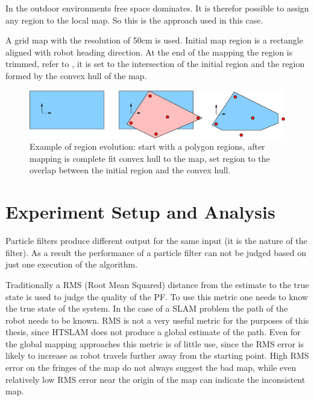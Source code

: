In the outdoor environments free space dominates. It is therefor
possible to assign any region to the local map. So this is the
approach used in this case.

A grid map with the resolution of 50cm is used. Initial map region is
a rectangle aligned with robot heading direction. At the end of the
mapping the region is trimmed, refer to
, it is set to the intersection
of the initial region and the region formed by the convex hull of the
map.

\begin{figure}[htbp]
  \centering
  \includegraphics[width=14cm]{Pics/fig_convex_reg}
  \caption{Example of region evolution: start with a polygon regions,
  after mapping is complete fit convex hull to the map, set region to
  the overlap between the initial region and the convex hull.}
  \label{fig:initial_region_vision}
\end{figure}

\section{Experiment Setup and Analysis}

Particle filters produce different output for the same input (it is
the nature of the filter). As a result the performance of a particle
filter can not be judged based on just one execution of the
algorithm. 


Traditionally a RMS (Root Mean Squared) distance from the estimate to
the true state is used to judge the quality of the PF. To use this
metric one needs to know the true state of the system. In the case of
a SLAM problem the path of the robot needs to be known. RMS is not a
very useful metric for the purposes of this thesis, since HTSLAM does
not produce a global estimate of the path. Even for the global mapping
approaches this metric is of little use, since the RMS error is likely
to increase as robot travels further away from the starting point.
High RMS error on the fringes of the map do not always suggest the bad
map, while even relatively low RMS error near the origin of the map
can indicate the inconsistent map.


